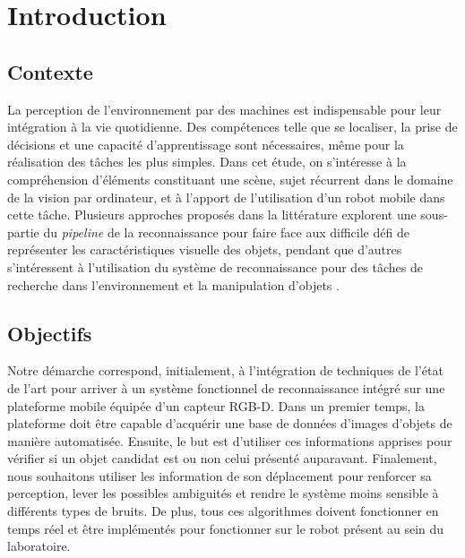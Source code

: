 \chapter{Introduction}


\section{Contexte}
La perception de l'environnement par des machines est indispensable pour leur intégration à la vie quotidienne. Des compétences telle que se localiser, la prise de décisions et une capacité d'apprentissage sont nécessaires, même pour la réalisation des tâches les plus simples. Dans cet étude, on s'intéresse à la compréhension d'éléments constituant une scène, sujet récurrent dans le domaine de la vision par ordinateur, et à l'apport de l'utilisation d'un robot mobile dans cette tâche. Plusieurs approches proposés dans la littérature explorent une sous-partie du \textit{pipeline} de la reconnaissance pour faire face aux difficile défi de représenter les caractéristiques visuelle des objets, pendant que d'autres s'intéressent à l'utilisation du système de reconnaissance pour des tâches de recherche dans l'environnement \cite{kragic2009object,shubina2010visual} et la manipulation d'objets \cite{browatzki2012active,collet2010efficient}.
\section{Objectifs}

Notre démarche correspond, initialement, à l'intégration de techniques de l'état de l'art pour arriver à un système fonctionnel de reconnaissance intégré sur une plateforme mobile équipée d'un capteur RGB-D. Dans un premier temps, la plateforme doit être capable d'acquérir une base de données d'images d'objets de manière automatisée. Ensuite, le but est d'utiliser ces informations apprises pour vérifier si un objet candidat est ou non celui présenté auparavant. Finalement, nous souhaitons utiliser les information de son déplacement pour renforcer sa perception, lever les possibles ambiguités et rendre le système moins sensible à différents types de bruits. De plus, tous ces algorithmes doivent fonctionner en temps réel et être implémentés pour fonctionner sur le robot présent au sein du laboratoire.

